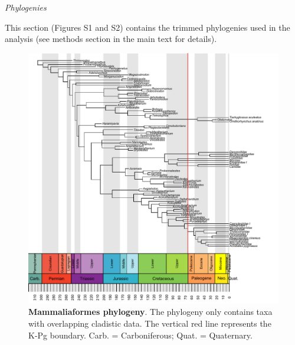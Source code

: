 \documentclass[12pt,letterpaper]{article}
\renewcommand{\subsection}[1]{%
\bigskip
\begin{center}
\begin{large}
\normalfont\itshape #1
\end{large}
\end{center}}
\begin{document}
\subsection{Phylogenies}
This section (Figures S1 and S2) contains the trimmed phylogenies used in the analysis (see methods section in the main text for details).
\begin{figure}[!htbp]
\centering
    \includegraphics[keepaspectratio=true]{Figures/Figure_S1.pdf}
\caption{\textbf{Mammaliaformes phylogeny}. The phylogeny only contains taxa with overlapping cladistic data. The vertical red line represents the K-Pg boundary. Carb. = Carboniferous; Quat. = Quaternary.}
\end{figure}
\end{document}
